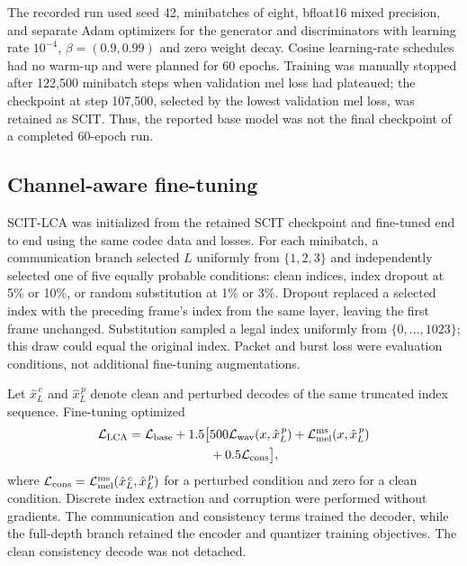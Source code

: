 \documentclass[final,5p,times,twocolumn]{elsarticle}
\begin{document}
The recorded run used seed 42, minibatches of eight, bfloat16 mixed precision, and separate Adam optimizers for the generator and discriminators with learning rate $10^{-4}$, $\beta=(0.9,0.99)$ and zero weight decay. Cosine learning-rate schedules had no warm-up and were planned for 60 epochs. Training was manually stopped after 122,500 minibatch steps when validation mel loss had plateaued; the checkpoint at step 107,500, selected by the lowest validation mel loss, was retained as SCIT. Thus, the reported base model was not the final checkpoint of a completed 60-epoch run.

\subsection{Channel-aware fine-tuning}
SCIT-LCA was initialized from the retained SCIT checkpoint and fine-tuned end to end using the same codec data and losses. For each minibatch, a communication branch selected $L$ uniformly from $\{1,2,3\}$ and independently selected one of five equally probable conditions: clean indices, index dropout at 5\% or 10\%, or random substitution at 1\% or 3\%. Dropout replaced a selected index with the preceding frame's index from the same layer, leaving the first frame unchanged. Substitution sampled a legal index uniformly from $\{0,\ldots,1023\}$; this draw could equal the original index. Packet and burst loss were evaluation conditions, not additional fine-tuning augmentations.

Let $\hat{x}_{L}^{\,c}$ and $\hat{x}_{L}^{\,p}$ denote clean and perturbed decodes of the same truncated index sequence. Fine-tuning optimized
\begin{equation}
\begin{split}
 \mathcal L_{\rm LCA}
 =\mathcal L_{\rm base}
 +1.5\bigl[&
 500\mathcal L_{\rm wav}(x,\hat{x}_{L}^{\,p})
 +\mathcal L_{\rm mel}^{\rm ms}(x,\hat{x}_{L}^{\,p})\\
 &+0.5\mathcal L_{\rm cons}\bigr],
\end{split}
\end{equation}
where $\mathcal L_{\rm cons}=\mathcal L_{\rm mel}^{\rm ms}(\hat{x}_{L}^{\,c},\hat{x}_{L}^{\,p})$ for a perturbed condition and zero for a clean condition. Discrete index extraction and corruption were performed without gradients. The communication and consistency terms trained the decoder, while the full-depth branch retained the encoder and quantizer training objectives. The clean consistency decode was not detached.
\end{document}
